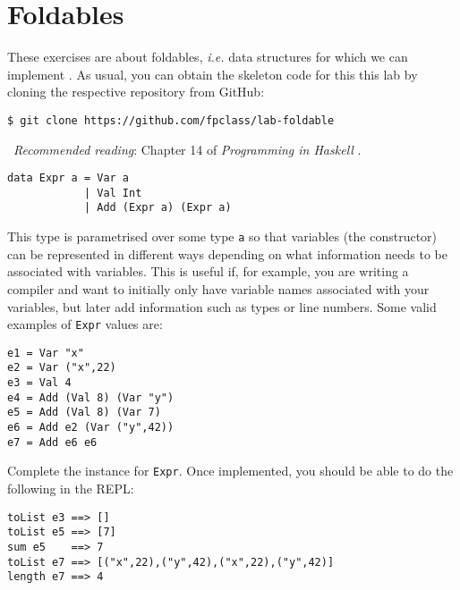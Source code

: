 \section{Foldables}

These exercises are about foldables, \emph{i.e.} data structures for which we can implement . As usual, you can obtain the skeleton code for this this lab by cloning the respective repository from GitHub:
\begin{verbatim}
$ git clone https://github.com/fpclass/lab-foldable
\end{verbatim}

\makebox[0.5cm]{\faBook}~\emph{Recommended reading}: Chapter 14 of \emph{Programming in Haskell} \citep{hutton2016programming}.

\taskLine 

\begin{verbatim}
data Expr a = Var a
            | Val Int
            | Add (Expr a) (Expr a)
\end{verbatim}
This type is parametrised over some type \texttt{\small a} so that variables (the  constructor) can be represented in different ways depending on what information needs to be associated with variables. This is useful if, for example, you are writing a compiler and want to initially only have variable names associated with your variables, but later add information such as types or line numbers. Some valid examples of \texttt{\small Expr} values are:
\begin{verbatim}
e1 = Var "x"
e2 = Var ("x",22)
e3 = Val 4 
e4 = Add (Val 8) (Var "y")
e5 = Add (Val 8) (Var 7)
e6 = Add e2 (Var ("y",42))
e7 = Add e6 e6
\end{verbatim}
Complete the  instance for \texttt{\small Expr}. Once implemented, you should be able to do the following in the REPL:
\begin{verbatim}
toList e3 ==> []
toList e5 ==> [7]
sum e5    ==> 7
toList e7 ==> [("x",22),("y",42),("x",22),("y",42)]
length e7 ==> 4
\end{verbatim}

\taskLine

